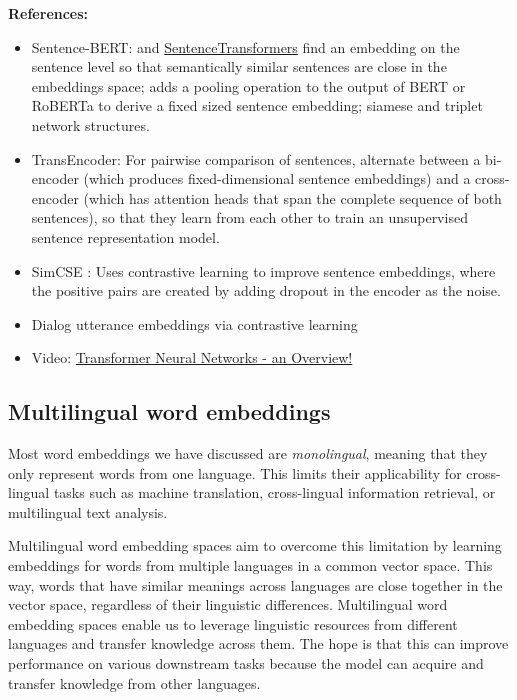 \documentclass[11pt, a4paper]{amsart}
\begin{document}
\noindent \textbf{References:}
\begin{itemize}
	\item Sentence-BERT: \cite{DBLP:journals/corr/abs-1908-10084} and \href{https://www.sbert.net/}{SentenceTransformers}
	find an embedding on the sentence level so that semantically similar sentences are close in the embeddings space;
	adds a pooling operation to the output of BERT or RoBERTa to derive a fixed sized sentence embedding;
	siamese and triplet network structures.
	\item TransEncoder: For pairwise comparison of sentences, \cite{DBLP:journals/corr/abs-2109-13059} alternate between a bi-encoder (which produces fixed-dimensional sentence embeddings) and a cross-encoder (which has attention heads that span the complete sequence of both sentences), so that they learn from each other to train an unsupervised sentence representation model.
	\item SimCSE \cite{DBLP:journals/corr/abs-2104-08821}: Uses contrastive learning to improve sentence embeddings, where the positive pairs are created by adding dropout in the encoder as the noise.
	\item Dialog utterance embeddings via contrastive learning \cite{https://doi.org/10.48550/arxiv.2205.13568}
	\item Video: \href{https://youtu.be/O3xbVmpdJwU}{Transformer Neural Networks - an Overview!}
\end{itemize}


\subsection{Multilingual word embeddings}

Most word embeddings we have discussed are \emph{monolingual}, meaning that they only represent words from one language.
This limits their applicability for cross-lingual tasks such as machine translation, cross-lingual information retrieval, or multilingual text analysis.

Multilingual word embedding spaces aim to overcome this limitation by learning embeddings for words from multiple languages in a common vector space. 
This way, words that have similar meanings across languages are close together in the vector space, regardless of their linguistic differences.
Multilingual word embedding spaces enable us to leverage linguistic resources from different languages and transfer knowledge across them.
The hope is that this can improve performance on various downstream tasks because the model can acquire and transfer knowledge from other languages.
\end{document}
